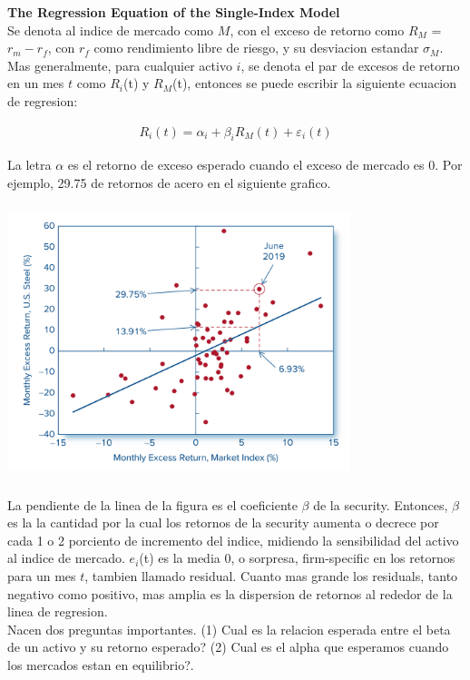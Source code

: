 \documentclass{article}
\begin{document}
\textbf{The Regression Equation of the Single-Index Model}
\\

Se denota al indice de mercado como $M$, con el exceso de retorno como $R_M$ = $r_m - r_f$, con $r_f$ como rendimiento libre de riesgo, y su desviacion estandar $\sigma_M$. Mas generalmente,
para cualquier activo $i$, se denota el par de excesos de retorno en un mes $t$ como $R_i$(t) y $R_M$(t), entonces se puede escribir la siguiente
ecuacion de regresion:

\[
\begin{aligned}
R_i(t) = \alpha_i + \beta_i R_M(t) + \varepsilon_i (t)
\end{aligned}
\]


La letra $\alpha$ es el retorno de exceso esperado cuando el exceso de mercado es 0. Por ejemplo, 29.75 de retornos de acero en el siguiente grafico.

\includegraphics[width=10cm, height=8cm]{./img/8_figura_excesos.png}

La pendiente de la linea de la figura es el coeficiente $\beta$ de la security. Entonces, $\beta$ es la la cantidad por la cual los retornos de
la security aumenta o decrece por cada 1 o 2 porciento de incremento del indice, midiendo la sensibilidad del activo al indice de mercado.
$e_i$(t) es la media 0, o sorpresa, firm-specific en los retornos para un mes $t$, tambien llamado residual. Cuanto mas grande los residuals, tanto negativo como positivo,
 mas amplia es la dispersion de retornos al rededor de la linea de regresion. 
\\

Nacen dos preguntas importantes. (1) Cual es la relacion esperada entre el beta de un activo y su retorno esperado? 
(2) Cual es el alpha que esperamos cuando los mercados estan en equilibrio?.
\\
\end{document}
